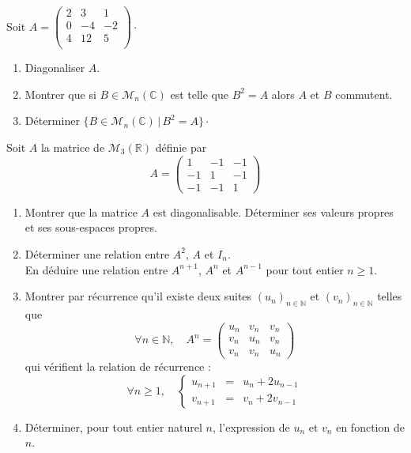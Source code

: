 \documentclass[a4paper,10pt]{report}
\begin{document}
\begin{Exa} Soit $A= \begin{pmatrix}
2 & 3 & 1 \\
0 & -4 & -2 \\
4 & 12 & 5 \\
\end{pmatrix}\cdot$

\begin{enumerate}
\item Diagonaliser $A$.
\item Montrer que si $B \in \mathcal{M}_n(\mathbb{C})$ est telle que $B^2=A$ alors $A$ et $B$ commutent.
\item Déterminer $\lbrace B \in \mathcal{M}_n(\mathbb{C}) \, \vert \, B^2=A \rbrace \cdot$
\end{enumerate}
\end{Exa} 


\begin{Exa}
Soit $A$ la matrice de $\mathcal{M}_{3}\left(\mathbb{R}\right)$
d\'efinie par
\[
A=\left(\begin{array}{ccc}
1 & -1 & -1\\
-1 & 1 & -1\\
-1 & -1 & 1
\end{array}\right)
\]

\begin{enumerate}
\item Montrer que la matrice $A$ est diagonalisable. D\'eterminer ses valeurs propres et ses sous-espaces propres.
\item D\'eterminer une relation entre $A^{2}$, $A$ et $I_{n}$.\\
En d\'eduire une relation entre $A^{n+1}$, $A^{n}$ et $A^{n-1}$ pour
tout entier $n\geq1$.
\item Montrer par r\'ecurrence qu'il existe deux suites $\left(u_{n}\right)_{n\in\mathbb{N}}$
et $\left(v_{n}\right)_{n\in\mathbb{N}}$ telles que
\[
\forall n\in\mathbb{N},\quad A^{n}=\left(\begin{array}{ccc}
u_{n} & v_{n} & v_{n}\\
v_{n} & u_{n} & v_{n}\\
v_{n} & v_{n} & u_{n}
\end{array}\right)
\]
qui v\'erifient la relation de r\'ecurrence :
\[
\forall n\geq1,\quad\left\{ \begin{array}{ccc}
u_{n+1} & = & u_{n}+2u_{n-1}\\
v_{n+1} & = & v_{n}+2v_{n-1}
\end{array}\right.
\]
\item D\'eterminer, pour tout entier naturel $n$, l'expression de $u_{n}$
et $v_{n}$ en fonction de $n$.
\end{enumerate}
\end{Exa}
\end{document}
